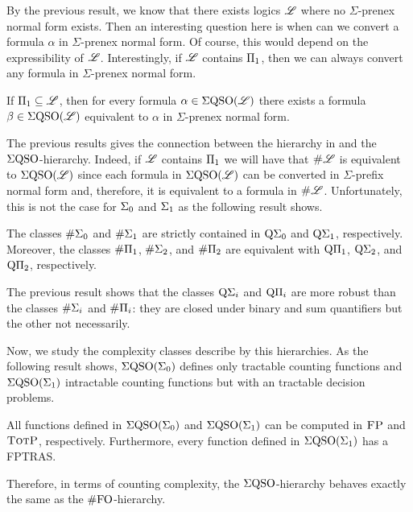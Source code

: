 By the previous result, we know that there exists logics $\mathscr{L}$ where no $\Sigma$-prenex normal form exists. 
Then an interesting question here is when can we convert a formula $\alpha$ in $\Sigma$-prenex normal form. 
Of course, this would depend on the expressibility of $\mathscr{L}$.
Interestingly, if $\mathscr{L}$ contains $\Pi_{1}$, then we can always convert any formula in $\Sigma$-prenex normal form. 
\begin{theorem}
	If $\Pi_{1} \subseteq \mathscr{L}$, then for every formula $\alpha \in \Sigma{\rm QSO}(\mathscr{L})$ there exists a formula $\beta \in \Sigma{\rm QSO}(\mathscr{L})$ equivalent to $\alpha$ in $\Sigma$-prenex normal form.
\end{theorem}

The previous results gives the connection between the hierarchy in \cite{SalujaST95} and the $\Sigma{\rm QSO}$-hierarchy. 
Indeed, if $\mathscr{L}$ contains $\Pi_{1}$ we will have that $\text{\sc \#} \mathscr{L}$ is equivalent to $\Sigma{\rm QSO}(\mathscr{L})$ since each formula in $\Sigma{\rm QSO}(\mathscr{L})$ can be converted in $\Sigma$-prefix normal form and, therefore, it is equivalent to a formula in $\text{\sc \#} \mathscr{L}$. 
Unfortunately, this is not the case for $\Sigma_{0}$ and $\Sigma_{1}$ as the following result shows.
\begin{proposition}
	The classes $\#\Sigma_{0}$ and $\#\Sigma_{1}$ are strictly contained in $\operatorname{Q}\!\Sigma_{0}$ and $\operatorname{Q}\!\Sigma_{1}$, respectively. Moreover, the classes $\#\Pi_{1}$, $\#\Sigma_{2}$, and $\#\Pi_{2}$ are equivalent with $\operatorname{Q}\!\Pi_{1}$, $\operatorname{Q}\!\Sigma_{2}$, and $\operatorname{Q}\!\Pi_{2}$, respectively.
\end{proposition}
The previous result shows that the classes $\operatorname{Q}\!\Sigma_{i}$ and $\operatorname{Q}\!\Pi_{i}$ are more robust than the classes $\#\Sigma_{i}$ and $\#\Pi_{i}$: they are closed under binary and sum quantifiers but the other not necessarily. 

Now, we study the complexity classes describe by this hierarchies. As the following result shows, $\Sigma{\rm QSO}(\Sigma_{0})$ defines only tractable counting functions and $\Sigma{\rm QSO}(\Sigma_{1})$ intractable counting functions but with an tractable decision problems. 
\begin{proposition}
All functions defined in $\Sigma{\rm QSO}(\Sigma_{0})$ and $\Sigma{\rm QSO}(\Sigma_{1})$ can be computed in $\text{\sc FP}$ and $\text{\sc TotP}$, respectively. Furthermore, every function defined in $\Sigma{\rm QSO}(\Sigma_{1})$ has a FPTRAS.
\end{proposition}
Therefore, in terms of counting complexity, the $\Sigma{\rm QSO}$-hierarchy behaves exactly the same as the $\#{\rm FO}$-hierarchy.

